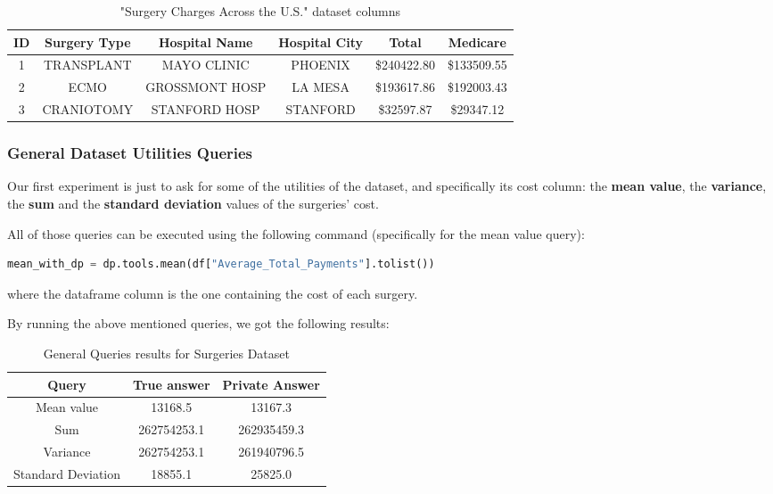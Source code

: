 \begin{table}[!htb]

    \caption{"Surgery Charges Across the U.S." dataset columns}
    \label{numbers}

    \begin{tabular}{| c | c | c | c | c| c |}
      \hline 
      ID & Surgery Type & Hospital Name & Hospital City & Total & Medicare \\
      \hline
      1 & TRANSPLANT & MAYO CLINIC & PHOENIX & \$240422.80 & \$133509.55\\
      \hline
      2 & ECMO &  GROSSMONT HOSP & LA MESA & \$193617.86 & \$192003.43 \\
      \hline
      3 & CRANIOTOMY & STANFORD HOSP &  STANFORD & \$32597.87 & \$29347.12  \\
      \hline
    \end{tabular}

\end{table}

\subsubsection{General Dataset Utilities Queries}

Our first experiment is just to ask for some of the utilities of the dataset, and specifically its cost column: the \textbf{mean value}, the \textbf{variance}, the \textbf{sum} and the \textbf{standard deviation} values of the surgeries' cost. 

All of those queries can be executed using the following command (specifically for the mean value query):
\bigskip

\begin{lstlisting}[language=Python]
mean_with_dp = dp.tools.mean(df["Average_Total_Payments"].tolist())
\end{lstlisting}
\bigskip

where the dataframe column is the one containing the cost of each surgery.

By running the above mentioned queries, we got the following results:

\begin{table}[!htb]
    \centering
    \caption{General Queries results for Surgeries Dataset}
    \label{numbers}

    \begin{tabular}{| c | c | c |}
      \hline 
      Query & True answer & Private Answer \\
      \hline
      Mean value & 13168.5 & 13167.3 \\
      \hline
      Sum & 262754253.1 &  262935459.3 \\
      \hline
      Variance & 262754253.1 & 261940796.5\\
      \hline
      Standard Deviation & 18855.1 & 25825.0\\
      \hline
    \end{tabular}

\end{table}


